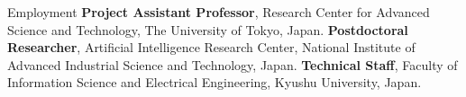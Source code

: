 \begin{rubric}{Employment}
\entry*[2021.04 -- present]%
	\textbf{Project Assistant Professor}, Research Center for Advanced Science and Technology, The University of Tokyo, Japan.
%
\entry*[2018.11 -- 2021.03]%
	\textbf{Postdoctoral Researcher}, Artificial Intelligence Research Center, National Institute of Advanced Industrial Science and Technology, Japan.
%
%
\entry*[2018.04 -- 2018.10]%
	\textbf{Technical Staff}, Faculty of Information Science and Electrical Engineering, Kyushu University, Japan.
%
\end{rubric}